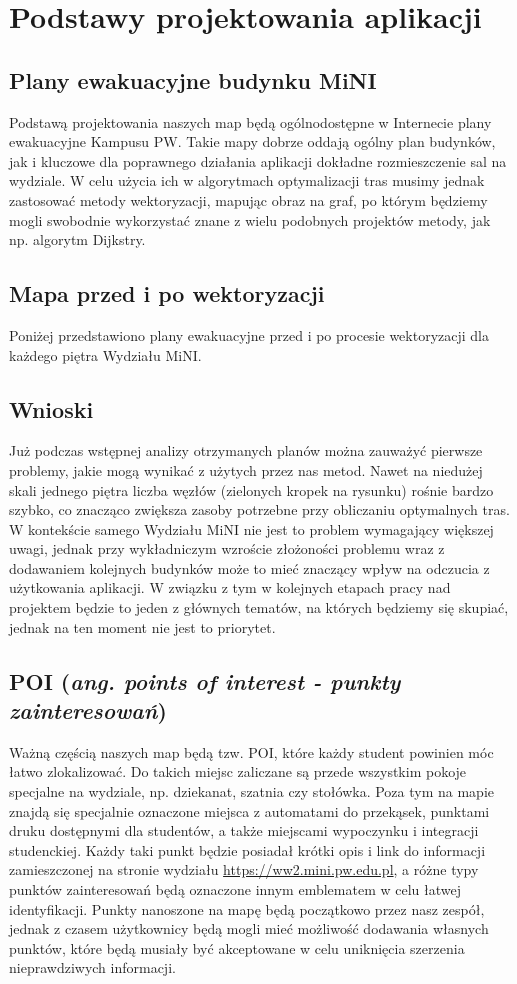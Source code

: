 \documentclass[14pt,a4paper]{extarticle}
\begin{document}
\section{Podstawy projektowania aplikacji}

\subsection{Plany ewakuacyjne budynku MiNI}
Podstawą projektowania naszych map będą ogólnodostępne w Internecie plany ewakuacyjne Kampusu PW. Takie mapy dobrze oddają ogólny plan budynków, jak i kluczowe dla poprawnego działania aplikacji dokładne rozmieszczenie sal na wydziale. W celu użycia ich w algorytmach optymalizacji tras musimy jednak zastosować metody wektoryzacji, mapując obraz na graf, po którym będziemy mogli swobodnie wykorzystać znane z wielu podobnych projektów metody, jak np. algorytm Dijkstry.

\subsection{Mapa przed i po wektoryzacji}
Poniżej przedstawiono plany ewakuacyjne przed i po procesie wektoryzacji dla każdego piętra Wydziału MiNI.

\subsection{Wnioski}
Już podczas wstępnej analizy otrzymanych planów można zauważyć pierwsze problemy, jakie mogą wynikać z użytych przez nas metod. Nawet na niedużej skali jednego piętra liczba węzłów (zielonych kropek na rysunku) rośnie bardzo szybko, co znacząco zwiększa zasoby potrzebne przy obliczaniu optymalnych tras. W kontekście samego Wydziału MiNI nie jest to problem wymagający większej uwagi, jednak przy wykładniczym wzroście złożoności problemu wraz z dodawaniem kolejnych budynków może to mieć znaczący wpływ na odczucia z użytkowania aplikacji. W związku z tym w kolejnych etapach pracy nad projektem będzie to jeden z głównych tematów, na których będziemy się skupiać, jednak na ten moment nie jest to priorytet.

\subsection{POI (\textit{ang. points of interest - punkty zainteresowań})}
Ważną częścią naszych map będą tzw. POI, które każdy student powinien móc łatwo zlokalizować. Do takich miejsc zaliczane są przede wszystkim pokoje specjalne na wydziale, np. dziekanat, szatnia czy stołówka. Poza tym na mapie znajdą się specjalnie oznaczone miejsca z automatami do przekąsek, punktami druku dostępnymi dla studentów, a także miejscami wypoczynku i integracji studenckiej. Każdy taki punkt będzie posiadał krótki opis i link do informacji zamieszczonej na stronie wydziału \url{https://ww2.mini.pw.edu.pl}, a różne typy punktów zainteresowań będą oznaczone innym emblematem w celu łatwej identyfikacji. Punkty nanoszone na mapę będą początkowo przez nasz zespół, jednak z czasem użytkownicy będą mogli mieć możliwość dodawania własnych punktów, które będą musiały być akceptowane w celu uniknięcia szerzenia nieprawdziwych informacji.
\end{document}
